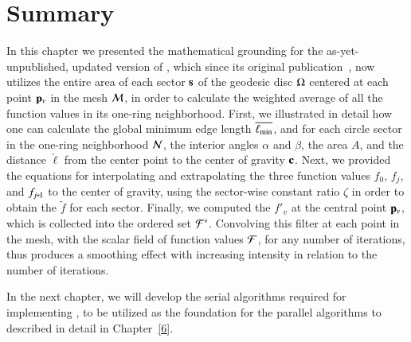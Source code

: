 \section{Summary}
\label{ch4sS}
In this chapter we presented the mathematical grounding for the as-yet-unpublished, updated version of , which since its original publication~\cite[s.~3.2]{Mara17}, now utilizes the entire area of each sector $\mathbf{s}$ of the geodesic disc $\Omega$ centered at each point $\mathbf{p}_v$ in the mesh $\mathcal{M}$, in order to calculate the weighted average of all the function values in its one-ring neighborhood. First, we illustrated in detail how one can calculate the global minimum edge length $\overline{\ell_\text{min}}$, and for each circle sector in the one-ring neighborhood $\mathcal{N}$, the interior angles $\alpha$ and $\beta$, the area $A$, and the distance $\check{\ell}$ from the center point to the center of gravity $\mathbf{c}$. Next, we provided the equations for interpolating and extrapolating the three function values $f_0$, $f_j$, and $f_{\sjpo}$ to the center of gravity, using the sector-wise constant ratio $\zeta$ in order to obtain the \wmfv{} $\tilde{f}$ for each sector. Finally, we computed the \wmfv{} $f'_v$ at the central point $\mathbf{p}_v$, which is collected into the ordered set $\mathcal{F}'$. Convolving this filter at each point in the mesh, with the scalar field of function values $\mathcal{F}$, for any number of iterations, thus produces a smoothing effect with increasing intensity in relation to the number of iterations.

In the next chapter, we will develop the serial algorithms required for implementing , to be utilized as the foundation for the parallel algorithms to described in detail in Chapter~\ref{6}.
